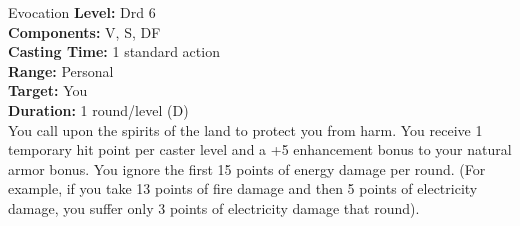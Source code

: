 {Evocation}
{
	\textbf{Level:}
	Drd 6\\
	\textbf{Components:}
	V, S, DF\\
	\textbf{Casting Time:}
	1 standard action\\
	\textbf{Range:}
	Personal\\
	\textbf{Target:}
	You\\
	\textbf{Duration:}
	1 round/level (D)\\
}
{
	You call upon the spirits of the land to protect you from harm. You receive 1 temporary hit point per caster level and a +5 enhancement bonus to your natural armor bonus. You ignore the first 15 points of energy damage per round. (For example, if you take 13 points of fire damage and then 5 points of electricity damage, you suffer only 3 points of electricity damage that round).
}
